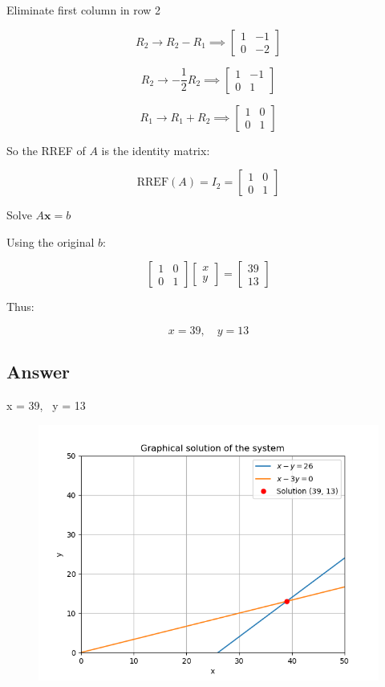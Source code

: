\documentclass[journal]{IEEEtran}
\begin{document}
Eliminate first column in row 2

\[
R_2 \to R_2 - R_1 \implies 
\begin{bmatrix}
1 & -1 \\
0 & -2
\end{bmatrix}
\]



\[
R_2 \to -\frac{1}{2} R_2 \implies 
\begin{bmatrix}
1 & -1 \\
0 & 1
\end{bmatrix}
\]



\[
R_1 \to R_1 + R_2 \implies 
\begin{bmatrix}
1 & 0 \\
0 & 1
\end{bmatrix}
\]

So the RREF of $A$ is the identity matrix:

\[
\text{RREF}(A) = I_2 = 
\begin{bmatrix}
1 & 0 \\
0 & 1
\end{bmatrix}
\]


Solve $A \mathbf{x} = b$

Using the original $b$:

\[
\begin{bmatrix}
1 & 0 \\
0 & 1
\end{bmatrix}
\begin{bmatrix} x \\ y \end{bmatrix} =
\begin{bmatrix} 39 \\ 13 \end{bmatrix}
\]

Thus:

\[
x = 39, \quad y = 13
\]

\subsection*{Answer}

x = 39, \ y = 13

\begin{figure}[H]
\begin{center}
\includegraphics[width=0.6\columnwidth]{Figs/Fig1.png}
\end{center}
\caption{}
\label{fig:Fig.1}
\end{figure}
\end{document}
